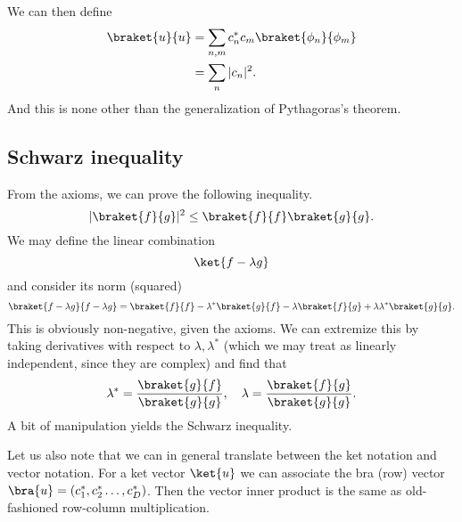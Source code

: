 We can then define
\begin{align}
    \braket{u}{u} &= \sum_{n,m} c_n^* c_m \braket{\phi_n}{\phi_m}\nonumber\\
        &= \sum_n |c_n|^2.
\end{align}
And this is none other than the generalization of Pythagoras's theorem.

\subsection*{Schwarz inequality}
From the axioms, we can prove the following inequality.
\begin{equation}
    |\braket{f}{g}|^2 \leq \braket{f}{f} \braket{g}{g}.
\end{equation}
We may define the linear combination
\begin{equation}
    \ket{f-\lambda g}
\end{equation}
and consider its norm (squared)
\begin{equation}
     \braket{f-\lambda g}{f-\lambda g} = \braket{f}{f} -\lambda^* \braket{g}{f} -\lambda \braket{f}{g} +\lambda \lambda^* \braket{g}{g}.
\end{equation}
This is obviously non-negative, given the axioms. We can extremize this by taking derivatives with respect to $\lambda,\lambda^*$ (which we may treat as linearly independent, since they are complex) and find that
\begin{equation}
    \lambda^* = \frac{\braket{g}{f}}{\braket{g}{g}}, \quad \lambda =\frac{\braket{f}{g}}{\braket{g}{g}}.
\end{equation}
A bit of manipulation yields the Schwarz inequality.

Let us also note that we can in general translate between the ket notation and vector notation. For a ket vector $\ket{u}$ we can associate the bra (row) vector $\bra{u}=(c_1^*,c_2^* \ldots, c_D^*)$. Then the vector inner product is the same as old-fashioned row-column multiplication.

